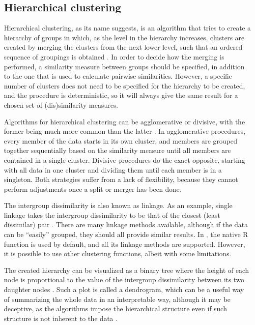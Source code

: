 \subsection{Hierarchical clustering}
\label{sec:hc}

Hierarchical clustering,
as its name suggests,
is an algorithm that tries to create a hierarchy of groups in which,
as the level in the hierarchy increases,
clusters are created by merging the clusters from the next lower level,
such that an ordered sequence of groupings is obtained \citep{hastie2009}.
In order to decide how the merging is performed,
a similarity measure between groups should be specified,
in addition to the one that is used to calculate pairwise similarities.
However, a specific number of clusters does not need to be specified for the hierarchy to be created,
and the procedure is deterministic,
so it will always give the same result for a chosen set of (dis)similarity measures.

Algorithms for hierarchical clustering can be agglomerative or divisive,
with the former being much more common than the latter \citep{hastie2009}.
In agglomerative procedures,
every member of the data starts in its own cluster,
and members are grouped together sequentially based on the similarity measure until all members are contained in a single cluster.
Divisive procedures do the exact opposite,
starting with all data in one cluster and dividing them until each member is in a singleton.
Both strategies suffer from a lack of flexibility,
because they cannot perform adjustments once a split or merger has been done.

The intergroup dissimilarity is also known as linkage.
As an example, single linkage takes the intergroup dissimilarity to be that of the closest (least dissimilar) pair \citep{hastie2009}.
There are many linkage methods available,
although if the data can be ``easily'' grouped,
they should all provide similar results.
In \dtwclust{}, the native R function  is used by default,
and all its linkage methods are supported.
However, it is possible to use other clustering functions,
albeit with some limitations.

The created hierarchy can be visualized as a binary tree where the height of each node is proportional to the value of the intergroup dissimilarity between its two daughter nodes \citep{hastie2009}.
Such a plot is called a dendrogram,
which can be a useful way of summarizing the whole data in an interpretable way,
although it may be deceptive,
as the algorithms impose the hierarchical structure even if such structure is not inherent to the data \citep{hastie2009}.

